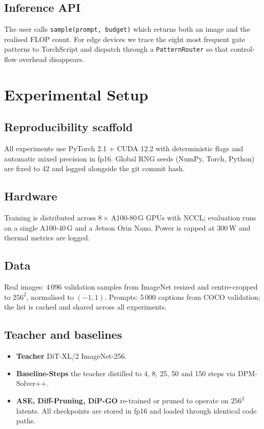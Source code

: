 \documentclass{article} %
\begin{document}
\subsection{Inference API}
The user calls \verb|sample(prompt, budget)| which returns both an image and the realised FLOP count. For edge devices we trace the eight most frequent gate patterns to TorchScript and dispatch through a \verb|PatternRouter| so that control-flow overhead disappears.

\section{Experimental Setup}
\label{sec:experimental}
\subsection{Reproducibility scaffold}
All experiments use PyTorch 2.1 + CUDA 12.2 with deterministic flags and automatic mixed precision in fp16. Global RNG seeds (NumPy, Torch, Python) are fixed to 42 and logged alongside the git commit hash.

\subsection{Hardware}
Training is distributed across 8\,\(\times\) A100-80\,G GPUs with NCCL; evaluation runs on a single A100-40\,G and a Jetson Orin Nano. Power is capped at 300\,W and thermal metrics are logged.

\subsection{Data}
Real images: 4\,096 validation samples from ImageNet resized and centre-cropped to \(256^{2}\), normalised to \((-1,1)\). Prompts: 5\,000 captions from COCO validation; the list is cached and shared across all experiments.

\subsection{Teacher and baselines}
\begin{itemize}
\item \textbf{Teacher} DiT-XL/2 ImageNet-256.
\item \textbf{Baseline-Steps} the teacher distilled to 4, 8, 25, 50 and 150 steps via DPM-Solver++.
\item \textbf{ASE, Diff-Pruning, DiP-GO} re-trained or pruned to operate on \(256^{2}\) latents. All checkpoints are stored in fp16 and loaded through identical code paths.
\end{itemize}
\end{document}

